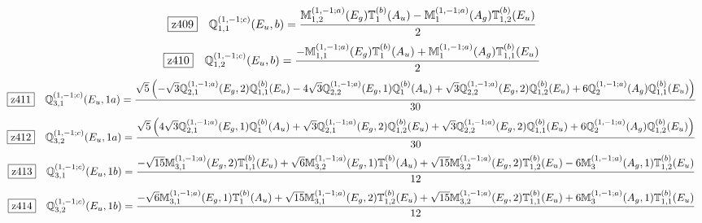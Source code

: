\documentclass[fleqn,10pt,landscape]{jsarticle}
\begin{document}
\begin{dmath*}
\hspace*{3mm}\fbox{z409}\quad \mathbb{Q}_{1,1}^{(1,-1;c)}(E_{u},b)=\frac{\mathbb{M}_{1,2}^{(1,-1;a)}(E_{g}) \mathbb{T}_{1}^{(b)}(A_{u}) - \mathbb{M}_{1}^{(1,-1;a)}(A_{g}) \mathbb{T}_{1,2}^{(b)}(E_{u})}{2}
\end{dmath*}
\begin{dmath*}
\hspace*{3mm}\fbox{z410}\quad \mathbb{Q}_{1,2}^{(1,-1;c)}(E_{u},b)=\frac{- \mathbb{M}_{1,1}^{(1,-1;a)}(E_{g}) \mathbb{T}_{1}^{(b)}(A_{u}) + \mathbb{M}_{1}^{(1,-1;a)}(A_{g}) \mathbb{T}_{1,1}^{(b)}(E_{u})}{2}
\end{dmath*}
\begin{dmath*}
\hspace*{3mm}\fbox{z411}\quad \mathbb{Q}_{3,1}^{(1,-1;c)}(E_{u},1a)=\frac{\sqrt{5} \left(- \sqrt{3} \mathbb{Q}_{2,1}^{(1,-1;a)}(E_{g},2) \mathbb{Q}_{1,1}^{(b)}(E_{u}) - 4 \sqrt{3} \mathbb{Q}_{2,2}^{(1,-1;a)}(E_{g},1) \mathbb{Q}_{1}^{(b)}(A_{u}) + \sqrt{3} \mathbb{Q}_{2,2}^{(1,-1;a)}(E_{g},2) \mathbb{Q}_{1,2}^{(b)}(E_{u}) + 6 \mathbb{Q}_{2}^{(1,-1;a)}(A_{g}) \mathbb{Q}_{1,1}^{(b)}(E_{u})\right)}{30}
\end{dmath*}
\begin{dmath*}
\hspace*{3mm}\fbox{z412}\quad \mathbb{Q}_{3,2}^{(1,-1;c)}(E_{u},1a)=\frac{\sqrt{5} \left(4 \sqrt{3} \mathbb{Q}_{2,1}^{(1,-1;a)}(E_{g},1) \mathbb{Q}_{1}^{(b)}(A_{u}) + \sqrt{3} \mathbb{Q}_{2,1}^{(1,-1;a)}(E_{g},2) \mathbb{Q}_{1,2}^{(b)}(E_{u}) + \sqrt{3} \mathbb{Q}_{2,2}^{(1,-1;a)}(E_{g},2) \mathbb{Q}_{1,1}^{(b)}(E_{u}) + 6 \mathbb{Q}_{2}^{(1,-1;a)}(A_{g}) \mathbb{Q}_{1,2}^{(b)}(E_{u})\right)}{30}
\end{dmath*}
\begin{dmath*}
\hspace*{3mm}\fbox{z413}\quad \mathbb{Q}_{3,1}^{(1,-1;c)}(E_{u},1b)=\frac{- \sqrt{15} \mathbb{M}_{3,1}^{(1,-1;a)}(E_{g},2) \mathbb{T}_{1,1}^{(b)}(E_{u}) + \sqrt{6} \mathbb{M}_{3,2}^{(1,-1;a)}(E_{g},1) \mathbb{T}_{1}^{(b)}(A_{u}) + \sqrt{15} \mathbb{M}_{3,2}^{(1,-1;a)}(E_{g},2) \mathbb{T}_{1,2}^{(b)}(E_{u}) - 6 \mathbb{M}_{3}^{(1,-1;a)}(A_{g},1) \mathbb{T}_{1,2}^{(b)}(E_{u})}{12}
\end{dmath*}
\begin{dmath*}
\hspace*{3mm}\fbox{z414}\quad \mathbb{Q}_{3,2}^{(1,-1;c)}(E_{u},1b)=\frac{- \sqrt{6} \mathbb{M}_{3,1}^{(1,-1;a)}(E_{g},1) \mathbb{T}_{1}^{(b)}(A_{u}) + \sqrt{15} \mathbb{M}_{3,1}^{(1,-1;a)}(E_{g},2) \mathbb{T}_{1,2}^{(b)}(E_{u}) + \sqrt{15} \mathbb{M}_{3,2}^{(1,-1;a)}(E_{g},2) \mathbb{T}_{1,1}^{(b)}(E_{u}) + 6 \mathbb{M}_{3}^{(1,-1;a)}(A_{g},1) \mathbb{T}_{1,1}^{(b)}(E_{u})}{12}
\end{dmath*}
\end{document}
